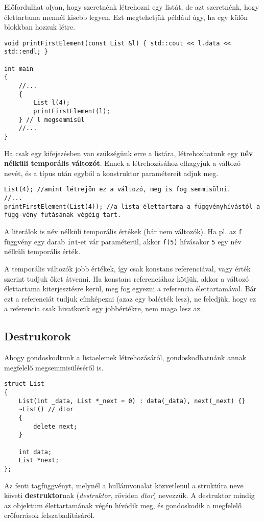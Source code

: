 \documentclass[../cpp_book/cpp_book.tex]{subfiles}
\begin{document}
	\medskip
	Előfordulhat olyan, hogy szeretnénk létrehozni egy listát, de azt szeretnénk, hogy élettartama mennél kisebb legyen. Ezt megtehetjük például úgy, ha egy külön blokkban hozzuk létre.
	\begin{lstlisting}
void printFirstElement(const List &l) { std::cout << l.data << std::endl; }

int main
{
	//...
	{
		List l(4);
		printFirstElement(l);
	} // l megsemmisül
	//...
}
	\end{lstlisting}
	Ha csak egy kifejezésben van szükségünk erre a listára, létrehozhatunk egy \textbf{név nélküli temporális változót}. Ennek a létrehozásához elhagyjuk a változó nevét, és a típus után egyből a konstruktor paramétereit adjuk meg.
	\begin{lstlisting}
List(4); //amint létrejön ez a változó, meg is fog semmisülni.
//...
printFirstElement(List(4)); //a lista élettartama a függvényhívástól a függ-vény futásának végéig tart.
	\end{lstlisting}
	\begin{note}
    A literálok is név nélküli temporális értékek (bár nem változók). Ha pl. az \texttt{f} függvény egy darab \texttt{int}-et vár paraméterül, akkor \texttt{f(5)} hívásakor \texttt{5} egy név nélküli temporális érték.
	\end{note}
	\begin{note}
		A temporális változók jobb értékek, így csak konstans referenciával, vagy érték szerint tudjuk őket átvenni. Ha konstans referenciához kötjük, akkor a változó élettartama kiterjesztésre kerül, meg fog egyezni a referencia élettartamával. Bár ezt a referenciát tudjuk címképezni (azaz egy balérték lesz), ne feledjük, hogy ez a referencia csak hivatkozik egy jobbértékre, nem maga lesz az.
	\end{note}
	\subsection{Destrukorok}
	Ahogy gondoskodtunk a listaelemek létrehozásáról, gondoskodhatnánk annak megfelelő megsemmisüléséről is.
	\begin{lstlisting}
struct List
{
	List(int _data, List *_next = 0) : data(_data), next(_next) {}
	~List() // dtor
	{
		delete next;
	}
	
	int data;
	List *next;
};
	\end{lstlisting}
	Az fenti tagfüggvényt, melynél a hullámvonalat közvetlenül a struktúra neve követi \textbf{destruktor}nak (\textit{destruktor}, röviden \textit{dtor}) nevezzük. A destruktor mindig az objektum élettartamának végén hívódik meg, és gondoskodik a megfelelő erőforrások felszabadításáról. 
	
\end{document}
